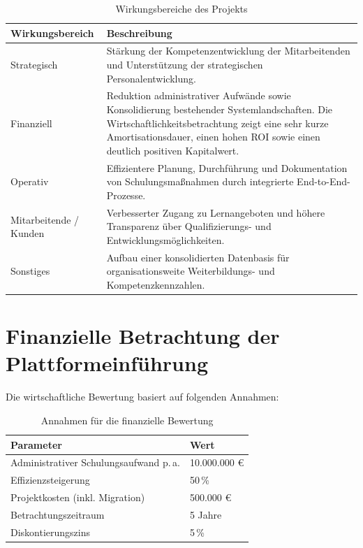 \begin{xltabular}{\textwidth}{@{}lX@{}}
  \caption{Wirkungsbereiche des Projekts} \label{tab:wirkungsbereiche} \\
  \toprule
  \textbf{Wirkungsbereich} & \textbf{Beschreibung} \\
  \midrule
  Strategisch &
  Stärkung der Kompetenzentwicklung der Mitarbeitenden und Unterstützung
  der strategischen Personalentwicklung. \\

  \addlinespace
  Finanziell &
  Reduktion administrativer Aufwände sowie Konsolidierung bestehender
  Systemlandschaften. Die Wirtschaftlichkeitsbetrachtung zeigt eine
  sehr kurze Amortisationsdauer, einen hohen \ac{ROI} sowie einen
  deutlich positiven Kapitalwert. \\

  \addlinespace
  Operativ &
  Effizientere Planung, Durchführung und Dokumentation von
  Schulungsmaßnahmen durch integrierte End-to-End-Prozesse. \\

  \addlinespace
  Mitarbeitende / Kunden &
  Verbesserter Zugang zu Lernangeboten und höhere Transparenz über
  Qualifizierungs- und Entwicklungsmöglichkeiten. \\

  \addlinespace
  Sonstiges &
  Aufbau einer konsolidierten Datenbasis für organisationsweite
  Weiterbildungs- und Kompetenzkennzahlen. \\

  \bottomrule
\end{xltabular}

\section{Finanzielle Betrachtung der Plattformeinführung}

Die wirtschaftliche Bewertung basiert auf folgenden Annahmen:

\begin{xltabular}{\textwidth}{ll}
  \caption{Annahmen für die finanzielle Bewertung} \label{tab:finanzielle-annahmen} \\
  \toprule
  \textbf{Parameter} & \textbf{Wert} \\
  \midrule
  Administrativer Schulungsaufwand p.\,a. & 10.000.000 € \\
  Effizienzsteigerung & 50\,\% \\
  Projektkosten (inkl. Migration) & 500.000 € \\
  Betrachtungszeitraum & 5 Jahre \\
  Diskontierungszins & 5\,\% \\
  \bottomrule
\end{xltabular}

